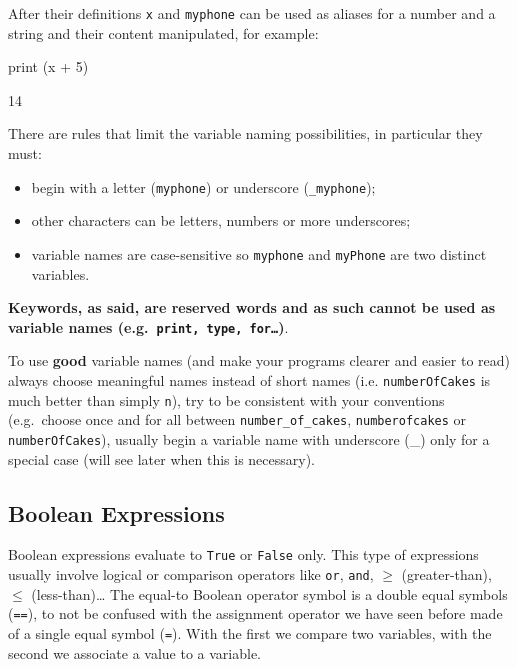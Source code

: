 After their definitions \texttt{x} and \texttt{myphone} can be used as aliases for a number and a string and their content manipulated, for example:

\begin{ipythonnon}
print (x + 5)
\end{ipythonnon}
\begin{ioutput}
14
\end{ioutput}

There are rules that limit the variable naming possibilities, in particular they must:
\begin{itemize}
\tightlist
\item begin with a letter (\texttt{myphone}) or underscore (\texttt{\_myphone});
\item other characters can be letters, numbers or more underscores;
\item variable names are case-sensitive so \texttt{myphone} and \texttt{myPhone} are two distinct variables.
\end{itemize}

\textbf{Keywords, as said, are reserved words and as such cannot be used as variable names (e.g.~\texttt{print, type, for\ldots})}.

To use \textbf{good} variable names (and make your programs clearer and easier to read) always choose meaningful names instead of short names (i.e. \texttt{numberOfCakes} is much better than simply \texttt{n}), try to be consistent with your conventions (e.g.~choose once and for all between \texttt{number\_of\_cakes}, \texttt{numberofcakes} or \texttt{numberOfCakes}), usually begin a variable name with underscore (\_) only for a special case (will see later when this is necessary).

\subsection{Boolean Expressions}\label{boolean-expressions}

Boolean expressions evaluate to \texttt{True} or \texttt{False} only. This type
of expressions usually involve logical or comparison operators like \texttt{or}, \texttt{and}, $\geq$ (greater-than), $\leq$ (less-than)\ldots
The equal-to Boolean operator symbol is a double equal symbols (\texttt{==}), to not be confused with the assignment operator we have seen before made of a single equal symbol (\texttt{=}). With the first we compare two variables, with the second we associate a value to a variable.

